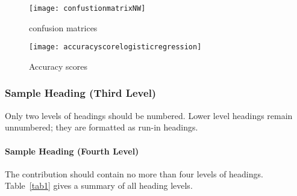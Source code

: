 \documentclass[runningheads]{llncs}
\begin{document}
\begin{figure}
\centering
\texttt{[image: confustionmatrixNW]} 
\caption{confusion matrices}
\label{fig:confusion}
\end{figure}

\begin{figure}
\centering
\texttt{[image: accuracyscorelogisticregression]} 
\caption{Accuracy scores}
\label{fig:confusion}
\end{figure}

\iffalse
Further, Fig.~\ref{fig:confusion} presents a confusion matrix using heat map. The matrix shows that out of 7660 actual instances (first row) of ``MachineOn = 0" (true negative), the classifier predicted correctly 7400 (96\%) of them. Similarly, out of 8030 instances (second row) of ``MachineOn = 1" (true positive), the classifier predicted correctly 5140 (64\%) of them. In the heat map, diagonal values represent accurate predictions, while non-diagonal elements are inaccurate predictions. Finally, Fig.~\ref{fig:auc} demonstrates a receiver operating characteristics curve (ROC) or area under the curve (AUC), which is commonly used to determine the performance of the classification algorithm. If the AUC score is close to 0.5, the classifier is just doing the random predictions, however, it predicts better as the score approaches close to 1. The AUC score of the proposed classifier is 0.87. It means that the classifier is quite decent at minimizing false negatives (``MachineOn = 1" which is classified as ``MachineOn = 0") and true negatives (''MachineOn = 0" which is classified as ``MachineOn = 0").
\fi




\iffalse





drill down/ drill through analysis
root cause analysis
correlation analysis


present root causes if possible
define some actions based on the given insight
\fi
\iffalse

\subsubsection{Sample Heading (Third Level)} Only two levels of
headings should be numbered. Lower level headings remain unnumbered;
they are formatted as run-in headings.

\paragraph{Sample Heading (Fourth Level)}
The contribution should contain no more than four levels of
headings. Table~\ref{tab1} gives a summary of all heading levels.
\end{document}
